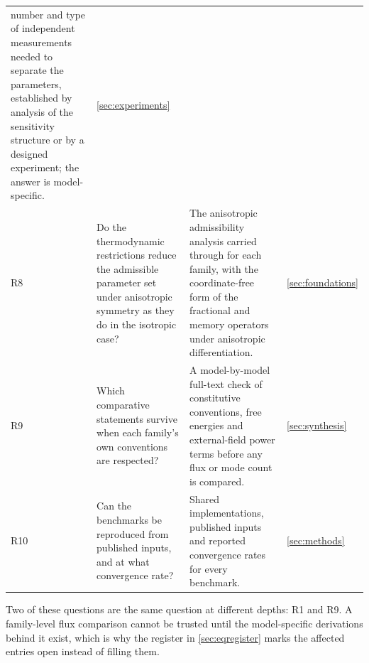 \begin{table}[H]
\begin{tabularx}{\textwidth}{@{}p{0.5cm}Y Y p{1.75cm}@{}}
  number and type of independent measurements needed to separate the parameters, established by analysis
  of the sensitivity structure or by a designed experiment; the answer is model-specific. &
  \cref{sec:experiments} \\
R8 & Do the thermodynamic restrictions reduce the admissible parameter set under anisotropic symmetry as
  they do in the isotropic case? & The anisotropic admissibility analysis carried through for each family,
  with the coordinate-free form of the fractional and memory operators under anisotropic differentiation.
  & \cref{sec:foundations} \\
R9 & Which comparative statements survive when each family's own conventions are respected? & A
  model-by-model full-text check of constitutive conventions, free energies and external-field power terms
  before any flux or mode count is compared. & \cref{sec:synthesis} \\
R10 & Can the benchmarks be reproduced from published inputs, and at what convergence rate? & Shared
  implementations, published inputs and reported convergence rates for every benchmark. &
  \cref{sec:methods} \\
\bottomrule
\end{tabularx}
\end{table}

Two of these questions are the same question at different depths: R1 and R9. A family-level flux
comparison cannot be trusted until the model-specific derivations behind it exist, which is why the
register in \cref{sec:eqregister} marks the affected entries open instead of filling them.

